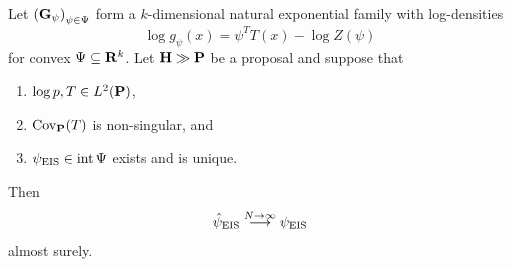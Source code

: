 \begin{theorem}
    \label{thm:eis-consistent}
    Let $\left( \G_{\psi} \right)_{\psi \in \Psi}$ form a $k$-dimensional natural exponential family with log-densities 
    $$
        \log g_{\psi}(x) = \psi^{T}T(x) - \log Z(\psi)
    $$
    for convex $\Psi \subseteq \R^{k}$. Let $\H \gg \P$ be a proposal and suppose that 
    \begin{enumerate}
        \item $\log p, T \in L^{2}(\P)$,
        \item $\cov_\P (T)$ is non-singular, and
        \item $\peis \in \operatorname{int} \Psi$ exists and is unique.
    \end{enumerate}
    
    Then 
    $$
        \hpeis \stackrel{N \to \infty}\longrightarrow \peis
    $$
    almost surely.
\end{theorem}


